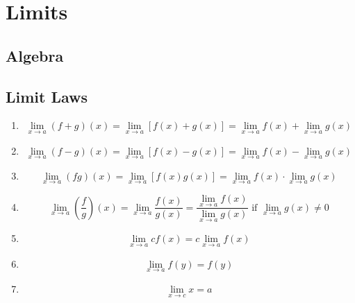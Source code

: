 \documentclass[20pt]{extarticle}
\newcommand{\abs}[1]{\left|#1\right|}
\newcommand{\LP}{\left(}
\newcommand{\RP}{\right)}
\begin{document}


\section*{\textbf{\color{draculaorange}Limits}}

\subsection*{\textbf{\color{draculaorange}Algebra}}
\subsection*{\textbf{\color{draculaorange}Limit Laws}}

\begin{enumerate}
  \item{\[\lim _{x \rightarrow a}(f+g)(x)=\lim _{x \rightarrow a}[f(x)+g(x)]=\lim _{x \rightarrow a} f(x)+\lim _{x \rightarrow a} g(x) \]}
  \item{\[\lim _{x \rightarrow a}(f-g)(x)=\lim _{x \rightarrow a}[f(x)-g(x)]=\lim _{x \rightarrow a} f(x)-\lim _{x \rightarrow a} g(x) \]}
  \item{\[\lim _{x \rightarrow a}(fg)(x)=\lim _{x \rightarrow a}[f(x) g(x)]=\lim _{x \rightarrow a} f(x) \cdot \lim _{x \rightarrow a} g(x) \]}
  \newpage\[\ \]
  \item{\[\lim _{x \rightarrow a} \LP\frac{f}{g}\RP(x)=\lim _{x \rightarrow a} \frac{f(x)}{g(x)}=\frac{\lim _{x \rightarrow a} f(x)}{\lim _{x \rightarrow a} g(x)} \text { if } \lim _{x \rightarrow a} g(x) \neq 0\]}
  \item{\[\lim _{x \rightarrow a}c f(x)=c \lim _{x \rightarrow a} f(x) \]}
  \item{\[\lim _{x \rightarrow a} f(y)=f(y)\]}
  \item{\[\lim _{x \rightarrow c} x=a\]}
\end{enumerate}
\newpage
\end{document}
